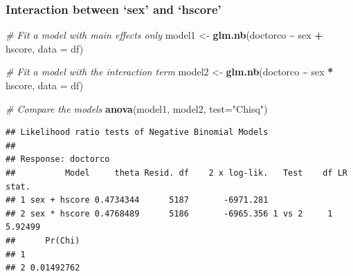 \documentclass[
]{article}
\newenvironment{Shaded}{\begin{snugshade}}{\end{snugshade}}
\newcommand{\AttributeTok}[1]{\textcolor[rgb]{0.13,0.29,0.53}{#1}}
\newcommand{\CommentTok}[1]{\textcolor[rgb]{0.56,0.35,0.01}{\textit{#1}}}
\newcommand{\FunctionTok}[1]{\textcolor[rgb]{0.13,0.29,0.53}{\textbf{#1}}}
\newcommand{\NormalTok}[1]{#1}
\newcommand{\OtherTok}[1]{\textcolor[rgb]{0.56,0.35,0.01}{#1}}
\newcommand{\SpecialCharTok}[1]{\textcolor[rgb]{0.81,0.36,0.00}{\textbf{#1}}}
\newcommand{\StringTok}[1]{\textcolor[rgb]{0.31,0.60,0.02}{#1}}
\begin{document}
\subsubsection{Interaction between `sex' and
`hscore'}\label{interaction-between-sex-and-hscore}

\begin{Shaded}
\begin{Highlighting}[]
\CommentTok{\# Fit a model with main effects only}
\NormalTok{model1 }\OtherTok{\textless{}{-}} \FunctionTok{glm.nb}\NormalTok{(doctorco }\SpecialCharTok{\textasciitilde{}}\NormalTok{ sex }\SpecialCharTok{+}\NormalTok{ hscore, }\AttributeTok{data =}\NormalTok{ df)}

\CommentTok{\# Fit a model with the interaction term}
\NormalTok{model2 }\OtherTok{\textless{}{-}} \FunctionTok{glm.nb}\NormalTok{(doctorco }\SpecialCharTok{\textasciitilde{}}\NormalTok{ sex }\SpecialCharTok{*}\NormalTok{ hscore, }\AttributeTok{data =}\NormalTok{ df)}

\CommentTok{\# Compare the models}
\FunctionTok{anova}\NormalTok{(model1, model2, }\AttributeTok{test=}\StringTok{"Chisq"}\NormalTok{)}
\end{Highlighting}
\end{Shaded}

\begin{verbatim}
## Likelihood ratio tests of Negative Binomial Models
## 
## Response: doctorco
##          Model     theta Resid. df    2 x log-lik.   Test    df LR stat.
## 1 sex + hscore 0.4734344      5187       -6971.281                      
## 2 sex * hscore 0.4768489      5186       -6965.356 1 vs 2     1  5.92499
##      Pr(Chi)
## 1           
## 2 0.01492762
\end{verbatim}
\end{document}
